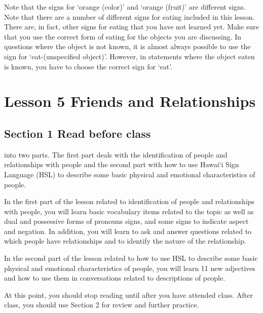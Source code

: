 \documentclass{tufte-book}
\begin{document}
\begin{enumerate}
Note that the signs for `orange (color)' and `orange (fruit)' are different signs.
Note that there are a number of different signs for eating included in this lesson. There are, in fact, other signs for eating that you have not learned yet. Make sure that you use the correct form of eating for the objects you are discussing. In questions where the object is not known, it is almost always possible to use the sign for `eat-(unspecified object)'. However, in statements where the object eaten is known, you have to choose the correct sign for `eat'.






\end{enumerate}


\chapter{Lesson 5 Friends and Relationships}
\section{Section 1 Read before class}

 into two parts. The first part deals with the identification of people and relationships with people and the second part with how to use Hawai`i Sign Language (HSL) to describe some basic physical and emotional characteristics of people.

In the first part of the lesson related to identification of people and relationships with people, you will learn basic vocabulary items related to the topic as well as dual and possessive forms of pronouns signs, and some signs to indicate aspect and negation. In addition, you will learn to ask and answer questions related to which people have relationships and to identify the nature of the relationship.

In the second part of the lesson related to how to use HSL to describe some basic physical and emotional characteristics of people, you will learn 11 new adjectives and how to use them in conversations related to descriptions of people.

At this point, you should stop reading until after you have attended class. After class, you should use Section 2 for review and further practice.
\end{document}
